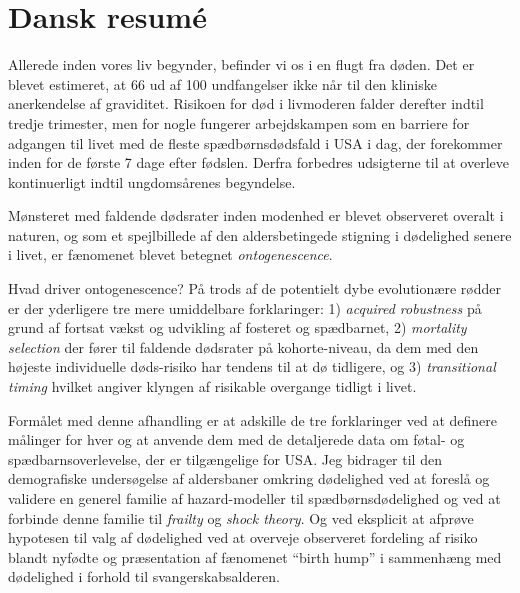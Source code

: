 \documentclass[10pt, twoside]{book}
\begin{document}
\clearpage


\section*{Dansk resumé}

Allerede inden vores liv begynder, befinder vi os i en flugt fra døden. Det er blevet estimeret, at 66 ud af 100 undfangelser ikke når til den kliniske anerkendelse af graviditet. Risikoen for død i livmoderen falder derefter indtil tredje trimester, men for nogle fungerer arbejdskampen som en barriere for adgangen til livet med de fleste spædbørnsdødsfald i USA i dag, der forekommer inden for de første 7 dage efter fødslen. Derfra forbedres udsigterne til at overleve kontinuerligt indtil ungdomsårenes begyndelse.

Mønsteret med faldende dødsrater inden modenhed er blevet observeret overalt i naturen, og som et spejlbillede af den aldersbetingede stigning i dødelighed senere i livet, er fænomenet blevet betegnet \emph{ontogenescence}.

Hvad driver ontogenescence? På trods af de potentielt dybe evolutionære rødder er der yderligere tre mere umiddelbare forklaringer: 1) \emph{acquired robustness} på grund af fortsat vækst og udvikling af fosteret og spædbarnet, 2) \emph{mortality selection} der fører til faldende dødsrater på kohorte-niveau, da dem med den højeste individuelle døds-risiko har tendens til at dø tidligere, og 3) \emph{transitional timing} hvilket angiver klyngen af risikable overgange tidligt i livet.

Formålet med denne afhandling er at adskille de tre forklaringer ved at definere målinger for hver og at anvende dem med de detaljerede data om føtal- og spædbarnsoverlevelse, der er tilgængelige for USA. Jeg bidrager til den demografiske undersøgelse af aldersbaner omkring dødelighed ved at foreslå og validere en generel familie af hazard-modeller til spædbørnsdødelighed og ved at forbinde denne familie til \emph{frailty} og \emph{shock theory}. Og ved eksplicit at afprøve hypotesen til valg af dødelighed ved at overveje observeret fordeling af risiko blandt nyfødte og præsentation af fænomenet ``birth hump'' i sammenhæng med dødelighed i forhold til svangerskabsalderen.
\end{document}

